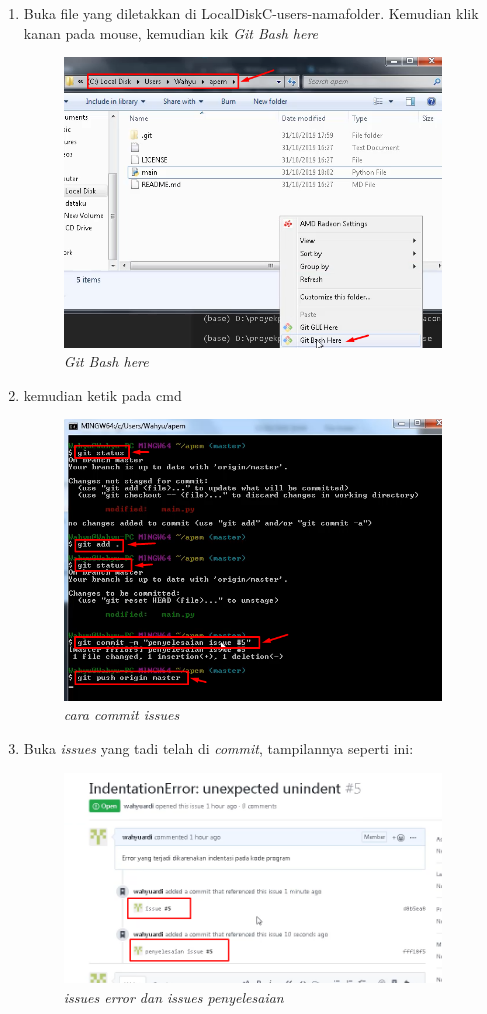 \begin{enumerate}
\item Buka file yang diletakkan di LocalDiskC-users-namafolder. Kemudian klik kanan pada mouse, kemudian kik \textit{Git Bash here}

\begin{figure}[!htbp]
    \centering
    \includegraphics[width=10cm]{figures/bukafolder}
    \caption{\textit{Git Bash here}}
\end{figure}

\newpage

\item kemudian ketik pada cmd

\begin{figure}[!htbp]
    \centering
    \includegraphics[width=10cm]{figures/ketik}
    \caption{\textit{cara commit issues}}
\end{figure}

\item Buka \textit{issues} yang tadi telah di \textit{commit}, tampilannya seperti ini:

\begin{figure}[!htbp]
    \centering
    \includegraphics[width=10cm]{figures/errordanpenaganan}
    \caption{\textit{issues error dan issues penyelesaian}}
\end{figure}


\end{enumerate}
